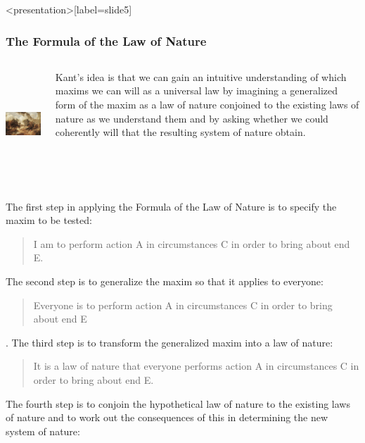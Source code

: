 \begin{frame}<presentation>[label=slide5]
    \frametitle{The Formula of the Law of Nature}
        \begin{columns}
            \begin{column}{6cm}
                \includegraphics[height=4cm]{../../graphics/nature.jpg}
            \end{column}
            \begin{column}{4cm}
                Kant's idea is that we can gain an intuitive understanding of which maxims we can will as a universal law by imagining a generalized form of the maxim as a law of nature conjoined to the existing laws of nature as we understand them and by asking  whether we could coherently will that the resulting system of nature obtain.
            \end{column}
        \end{columns}
\end{frame}

The first step in applying the Formula of the Law of Nature is to specify the maxim to be tested:

\begin{quote}
	I am to perform action A in circumstances C in order to bring about end E.
\end{quote}

The second step is to generalize the maxim so that it applies to everyone:

\begin{quote}
	Everyone is to perform action A in circumstances C in order to bring about end E
\end{quote}
.
The third step is to transform the generalized maxim into a law of nature:

\begin{quote}
	It is a law of nature that everyone performs action A in circumstances C in order to bring about end E.
\end{quote}

The fourth step is to conjoin the hypothetical law of nature to the existing laws of nature and to work out the consequences of this in determining the new system of nature:

